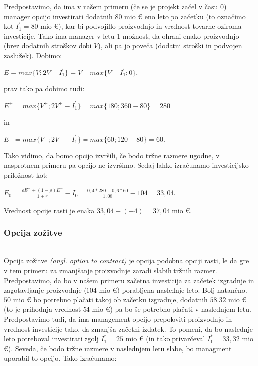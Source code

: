 \documentclass[12pt, a4paper]{amsart}
\theoremstyle{definition} %
\theoremstyle{plain} %
\begin{document}
Predpostavimo, da ima v našem primeru (če se je projekt začel v času 0) manager opcijo investirati dodatnih $80$ mio € eno leto po začetku (to označimo kot $I^'_1 = 80$ mio €), kar bi podvojillo proizvodnjo in vrednost tovarne oziroma investicije. Tako ima manager v letu 1 možnost, da ohrani enako proizvodnjo (brez dodatnih stroškov dobi $V$), ali pa jo poveča (dodatni stroški in podvojen zaslužek). Dobimo:\\

 \begin{center}
$E = max\{V; 2V - I^'_1\} = V + max\{V - I^'_1; 0\}$,
\end{center}
prav tako pa dobimo tudi:\\
\begin{center}
$E^+ = max\{V^+; 2V^+ - I^'_1\} =  max\{180; 360 - 80\} = 280$
\end{center}
in
\begin{center}
$E^- = max\{V^-; 2V^- - I^'_1\} =  max\{60; 120 - 80\} = 60$.
\end{center}

Tako vidimo, da bomo opcijo izvršili, če bodo tržne razmere ugodne, v nasprotnem primeru pa opcijo ne izvršimo. Sedaj lahko izračunamo investicijsko priložnost kot:
\begin{center}
$E_0 = \tfrac{\rho E^+ + (1-\rho)E^-}{1+r} - I_0= \tfrac{0,4 * 280 + 0,6 * 60}{1,08} - 104 = 33,04 $.
\end{center}
Vrednost opcije rasti je enaka $33,04-(-4)=37,04$ mio €.\\

\subsubsection{Opcija zožitve}
\cite[str. 163, 164]{Trigeorgis}\\
Opcija zožitve \textit{(angl. option to contract)} je opcija podobna opciji rasti, le da gre v tem primeru za zmanjšanje proizvodnje zaradi slabih tržnih razmer. \\

Predpostavimo, da bo v našem primeru začetna investicija za začetek izgradnje in zagotavljanje proizvodnje ($104$ mio €) porabljena naslednje leto. Bolj natančno, $50$ mio € bo potrebno plačati takoj ob začetku izgradnje, dodatnih $58.32$ mio € (to je prihodnja vrednost $54$ mio €) pa bo še potrebno plačati v naslednjem letu. Predpostavimo tudi, da ima management opcijo  prepoloviti proizvodnjo in vrednost investicije tako, da zmanjša začetni izdatek. To pomeni, da bo naslednje leto potreboval investirati zgolj $I^{''}_1 = 25$ mio € (in tako privarčeval $I^*_1 = 33,32$ mio €). Seveda, če bodo tržne razmere v naslednjem letu slabe, bo managment uporabil to opcijo. Tako izračunamo:\\
\end{document}
